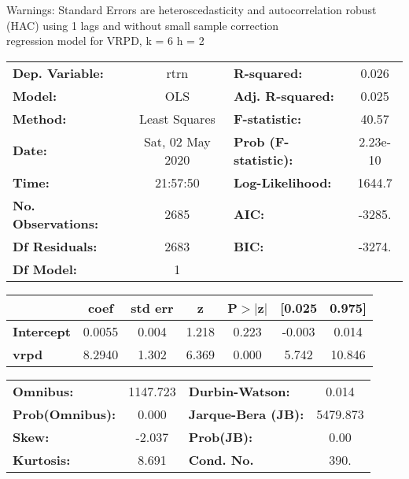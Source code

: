 Warnings: \newline
 [1] Standard Errors are heteroscedasticity and autocorrelation robust (HAC) using 1 lags and without small sample correction\\ 

regression model for VRPD, k = 6 h = 2\begin{center}
\begin{tabular}{lclc}
\toprule
\textbf{Dep. Variable:}    &       rtrn       & \textbf{  R-squared:         } &     0.026   \\
\textbf{Model:}            &       OLS        & \textbf{  Adj. R-squared:    } &     0.025   \\
\textbf{Method:}           &  Least Squares   & \textbf{  F-statistic:       } &     40.57   \\
\textbf{Date:}             & Sat, 02 May 2020 & \textbf{  Prob (F-statistic):} &  2.23e-10   \\
\textbf{Time:}             &     21:57:50     & \textbf{  Log-Likelihood:    } &    1644.7   \\
\textbf{No. Observations:} &        2685      & \textbf{  AIC:               } &    -3285.   \\
\textbf{Df Residuals:}     &        2683      & \textbf{  BIC:               } &    -3274.   \\
\textbf{Df Model:}         &           1      & \textbf{                     } &             \\
\bottomrule
\end{tabular}
\begin{tabular}{lcccccc}
                   & \textbf{coef} & \textbf{std err} & \textbf{z} & \textbf{P$> |$z$|$} & \textbf{[0.025} & \textbf{0.975]}  \\
\midrule
\textbf{Intercept} &       0.0055  &        0.004     &     1.218  &         0.223        &       -0.003    &        0.014     \\
\textbf{vrpd}      &       8.2940  &        1.302     &     6.369  &         0.000        &        5.742    &       10.846     \\
\bottomrule
\end{tabular}
\begin{tabular}{lclc}
\textbf{Omnibus:}       & 1147.723 & \textbf{  Durbin-Watson:     } &    0.014  \\
\textbf{Prob(Omnibus):} &   0.000  & \textbf{  Jarque-Bera (JB):  } & 5479.873  \\
\textbf{Skew:}          &  -2.037  & \textbf{  Prob(JB):          } &     0.00  \\
\textbf{Kurtosis:}      &   8.691  & \textbf{  Cond. No.          } &     390.  \\
\bottomrule
\end{tabular}
\end{center}

